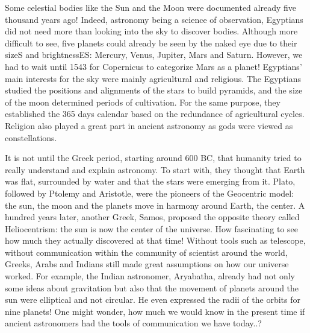 



Some celestial bodies like the Sun and the Moon were documented already five thousand years ago! 
Indeed, astronomy being a science of observation, Egyptians did not need more than looking into the sky to discover bodies. 
Although more difficult to see, five planets could already be seen by the naked eye due to their sizeS and brightnessES: Mercury, Venus, Jupiter, Mars and Saturn. 
However, we had to wait until 1543 for Copernicus to categorize Mars as a planet! 
Egyptians' main interests for the sky were mainly agricultural and religious. 
The Egyptians studied the positions and alignments of the stars to build pyramids, and the size of the moon determined periods of cultivation. 
For the same purpose, they established the 365 days calendar based on the redundance of agricultural cycles. 
Religion also played a great part in ancient astronomy as gods were viewed as constellations. 


It is not until the Greek period, starting around 600 BC, that humanity tried to really understand and explain astronomy. 
To start with, they thought that Earth was flat, surrounded by water and that the stars were emerging from it. 
Plato, followed by Ptolemy and Aristotle, were the pioneers of the Geocentric model: the sun, the moon and the planets move in harmony around Earth, the center. 
A hundred years later, another Greek, Samos, proposed the opposite theory called Heliocentrism: the sun is now the center of the universe. 
How fascinating to see how much they actually discovered at that time!  
Without tools such as telescope, without communication within the community of scientist around the world, Greeks, Arabs and Indians still made great assumptions on how our universe worked. 
For example, the Indian astronomer, Aryabatha, already had not only some ideas about gravitation but also that the movement of planets around the sun were elliptical and not circular. He even expressed the radii of the orbits for nine planets! 
One might wonder, how much we would know in the present time if ancient astronomers had the tools of communication we have today..? \\



